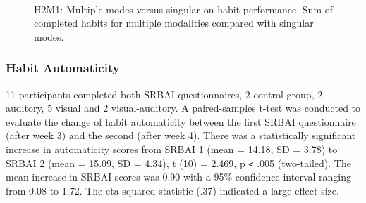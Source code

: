 \begin{figure}[H]
\centering

  \caption{H2M1: Multiple modes versus singular on habit performance. Sum of completed habits for multiple modalities compared with singular modes.}~\label{fig:m1_h2}
\end{figure}


\subsubsection*{Habit Automaticity}
11 participants completed both SRBAI questionnaires, 2 control group, 2 auditory, 5 visual and 2 visual-auditory. A paired-samples t-test was conducted to evaluate the change of habit automaticity between the first SRBAI questionnaire (after week 3) and the second (after week 4). There was a statistically significant increase in automaticity scores from SRBAI 1 (mean = 14.18, SD = 3.78) to SRBAI 2 (mean = 15.09, SD = 4.34), t (10) = 2.469, p \verb|<| .005 (two-tailed). The mean increase in SRBAI scores was 0.90 with a 95\% confidence interval ranging from 0.08 to 1.72. The eta squared statistic (.37) indicated a large effect size.



